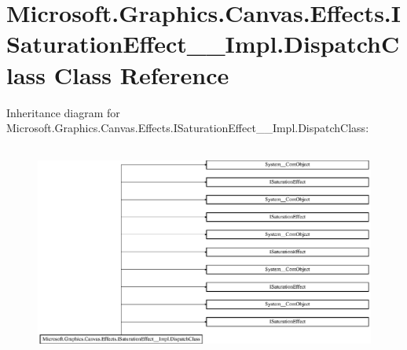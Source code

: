 \hypertarget{class_microsoft_1_1_graphics_1_1_canvas_1_1_effects_1_1_i_saturation_effect_____impl_1_1_dispatch_class}{}\section{Microsoft.\+Graphics.\+Canvas.\+Effects.\+I\+Saturation\+Effect\+\_\+\+\_\+\+Impl.\+Dispatch\+Class Class Reference}
\label{class_microsoft_1_1_graphics_1_1_canvas_1_1_effects_1_1_i_saturation_effect_____impl_1_1_dispatch_class}
Inheritance diagram for Microsoft.\+Graphics.\+Canvas.\+Effects.\+I\+Saturation\+Effect\+\_\+\+\_\+\+Impl.\+Dispatch\+Class\+:\begin{figure}[H]
\begin{center}
\leavevmode
\includegraphics[height=7.080460cm]{class_microsoft_1_1_graphics_1_1_canvas_1_1_effects_1_1_i_saturation_effect_____impl_1_1_dispatch_class}
\end{center}
\end{figure}
